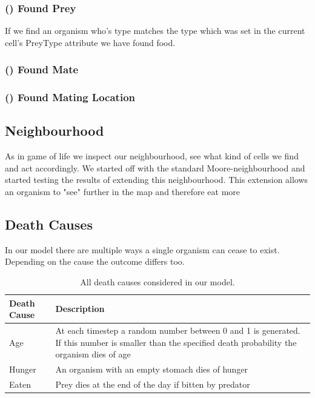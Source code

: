 \documentclass[11pt]{article}
\begin{document}
\addtocounter{protocolCounter}{1}

\subsubsection{() Found Prey}
If we find an organism who's type matches the type which was set in the current cell's PreyType attribute we have found food. 

\addtocounter{protocolCounter}{1}
\subsubsection{() Found Mate}

\addtocounter{protocolCounter}{1}
\subsubsection{() Found Mating Location}

 
\subsection{Neighbourhood}
\label{sec:neighbourhood}
As in game of life we inspect our neighbourhood, see what kind of cells we find and act accordingly. 
We started off with the standard Moore-neighbourhood and started testing the results of extending this neighbourhood. This extension allows an organism to "see" further in the map and therefore eat more

\subsection{Death Causes}
In our model there are multiple ways a single organism can cease to exist. Depending on the cause the outcome differs too. 

\begin{table}[htbp]
\centering
\begin{tabular}{l|p{11cm}}
Death Cause & Description \\ 
\hline 
\hline 
Age & At each timestep a random number between 0 and 1 is generated. If this number is smaller than the specified death probability the organism dies of age\\ 
\hline 
Hunger & An organism with an empty stomach dies of hunger \\ 
\hline 
Eaten & Prey dies at the end of the day if bitten by predator \\  
\end{tabular}
\caption{All death causes considered in our model.}
\label{tab:deathCauses}
\end{table}
\end{document}
